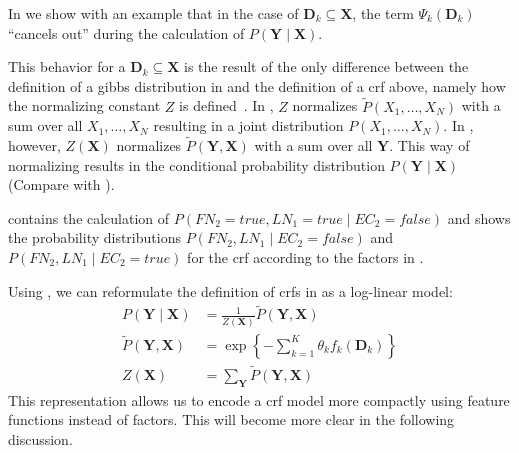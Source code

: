 In  we show with an example that in the case of $\mathbf{D}_k\subseteq \mathbf{X}$, the term $\Psi_k(\mathbf{D}_k)$ ``cancels out'' during the calculation of $P(\mathbf{Y}\mid\mathbf{X})$.

This behavior for a $\mathbf{D}_k\subseteq\mathbf{X}$ is the result of the only difference between the definition of a \gls{gibbs distribution} in  and the definition of a \gls{crf} above, namely how the normalizing constant $Z$ is defined~\citep{koller2009probabilistic}.
In , $Z$ normalizes $\tilde{P}(X_1,\dots,X_N)$ with a sum over all $X_1,\dots,X_N$ resulting in a \gls{joint distribution} $P(X_1,\dots,X_N)$.
In , however, $Z(\mathbf{X})$ normalizes $\tilde{P}(\mathbf{Y},\mathbf{X})$ with a sum over all $\mathbf{Y}$.
This way of normalizing results in the \gls{conditional probability distribution} $P(\mathbf{Y}\mid\mathbf{X})$ (Compare with ).

 contains the calculation of $P(FN_2{=}true,LN_1{=}true \mid EC_2{=}false)$ and  shows the \glspl{probability distribution} $P(FN_2,LN_1 \mid EC_2{=}false)$ and $P(FN_2,LN_1 \mid EC_2{=}true)$ for the \gls{crf} according to the \glspl{factor} in .

\bigskip

Using , we can reformulate the definition of \glspl{crf} in  as a \gls{log-linear model}:
\begin{equation}
  \label{equ:crf-log-linear}
  \begin{split}
    P(\mathbf{Y}\mid\mathbf{X}) & = \frac{1}{Z(\mathbf{X})}\tilde{P}(\mathbf{Y},\mathbf{X}) \\
    \tilde{P}(\mathbf{Y},\mathbf{X}) & = \exp\left\{ -\sum_{k=1}^K \theta_k f_k\left(\mathbf{D}_k\right)\right\} \\
    Z(\mathbf{X}) & = \sum_{\mathbf{Y}}\tilde{P}(\mathbf{Y},\mathbf{X})
  \end{split}
\end{equation}
This representation allows us to encode a \gls{crf} model more compactly using \glspl{feature function} instead of \glspl{factor}.
This will become more clear in the following discussion.

\bigskip

